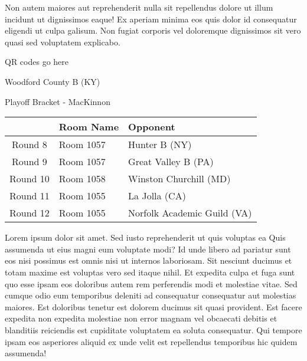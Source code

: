 \documentclass{article}%
\begin{document}
\newline%
Non autem maiores aut reprehenderit nulla sit repellendus dolore ut illum incidunt ut dignissimos eaque! Ex aperiam minima eos quis dolor id consequatur eligendi ut culpa galisum. Non fugiat corporis vel doloremque dignissimos sit vero quasi sed voluptatem explicabo.\newline%
\newline%
%
\vspace*{30pt}%
\begin{center}%
\begin{Huge}%
QR codes go here%
\end{Huge}%
\end{center}%
\newpage%
\begin{center}%
\begin{Huge}%
Woodford County B (KY)%
\end{Huge}%
\vspace*{8pt}%
\linebreak%
\begin{Large}%
Playoff Bracket {-} MacKinnon%
\end{Large}%
\end{center}%
\begin{tabularx}{\textwidth}{|c|Y|Y|}%
\hline%
&Room Name&Opponent\\%
\hline%
Round 8&Room 1057&Hunter B (NY)\\%
Round 9&Room 1057&Great Valley B (PA)\\%
Round 10&Room 1058&Winston Churchill (MD)\\%
Round 11&Room 1055&La Jolla (CA)\\%
Round 12&Room 1055&Norfolk Academic Guild (VA)\\%
\hline%
\end{tabularx}%
\vspace*{8pt}%
\linebreak%
\newline%
\newline%
Lorem ipsum dolor sit amet. Sed iusto reprehenderit ut quis voluptas ea Quis assumenda ut eius magni eum voluptate modi? Id unde libero ad pariatur sunt eos nisi possimus est omnis nisi ut internos laboriosam. Sit nesciunt ducimus et totam maxime est voluptas vero sed itaque nihil. Et expedita culpa et fuga sunt quo esse ipsam eos doloribus autem rem perferendis modi et molestiae vitae.\newline%
\newline%
Sed cumque odio eum temporibus deleniti ad consequatur consequatur aut molestias maiores. Est doloribus tenetur est dolorem ducimus sit quasi provident. Est facere expedita non expedita molestiae non error magnam vel obcaecati debitis et blanditiis reiciendis est cupiditate voluptatem ea soluta consequatur. Qui tempore ipsam eos asperiores aliquid ex unde velit est repellendus temporibus hic quidem assumenda!\newline%
\end{document}
